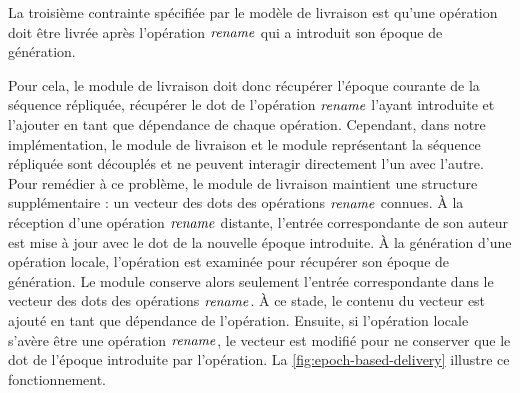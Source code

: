 La troisième contrainte spécifiée par le modèle de livraison est qu'une opération doit être livrée après l'opération $\mathit{rename}$ qui a introduit son époque de génération.

Pour cela, le module de livraison doit donc récupérer l'époque courante de la séquence répliquée, récupérer le dot de l'opération $\mathit{rename}$ l'ayant introduite et l'ajouter en tant que dépendance de chaque opération.
Cependant, dans notre implémentation, le module de livraison et le module représentant la séquence répliquée sont découplés et ne peuvent interagir directement l'un avec l'autre.\\

Pour remédier à ce problème, le module de livraison maintient une structure supplémentaire : un vecteur des dots des opérations $\mathit{rename}$ connues.
À la réception d'une opération $\mathit{rename}$ distante, l'entrée correspondante de son auteur est mise à jour avec le dot de la nouvelle époque introduite.
À la génération d'une opération locale, l'opération est examinée pour récupérer son époque de génération.
Le module conserve alors seulement l'entrée correspondante dans le vecteur des dots des opérations $\mathit{rename}$.
À ce stade, le contenu du vecteur est ajouté en tant que dépendance de l'opération.
Ensuite, si l'opération locale s'avère être une opération $\mathit{rename}$, le vecteur est modifié pour ne conserver que le dot de l'époque introduite par l'opération.
La \autoref{fig:epoch-based-delivery} illustre ce fonctionnement.\\

